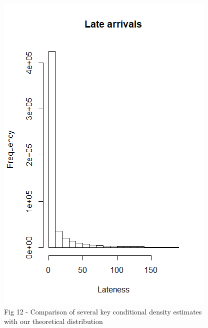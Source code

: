 \documentclass[12pt, a4paper, openany]{book}
\begin{document}
			\begin{figure}
			\centering
	 		\includegraphics[width = .45 \textwidth]{../figures/LateArrivalsHistogram}
	 		\caption{Fig 12  - Comparison of several key conditional density estimates with our theoretical distribution}
	 		\end{figure}
\end{document}
